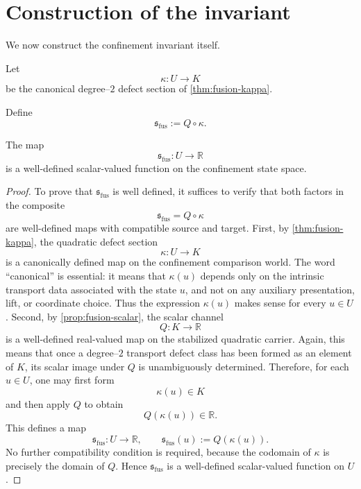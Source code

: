\section{Construction of the invariant}
\label{sec:fusion-construction}
We now construct the confinement invariant itself.
\begin{definition}
	Let
	\[
		\kappa:U\to K
	\]
	be the canonical degree--\(2\) defect section of
	\cref{thm:fusion-kappa}.
\end{definition}
\begin{definition}
	Define
	\[
		\mathfrak s_{\mathrm{fus}}:=Q\circ \kappa.
	\]
\end{definition}
\begin{theorem}[Existence]
	\label{thm:fusion-existence}
	The map
	\[
		\mathfrak s_{\mathrm{fus}}:U\to\mathbb R
	\]
	is a well-defined scalar-valued function on the confinement state space.
\end{theorem}
\begin{proof}
	To prove that \(\mathfrak s_{\mathrm{fus}}\) is well defined, it suffices to verify that both
	factors in the composite
	\[
		\mathfrak s_{\mathrm{fus}}=Q\circ\kappa
	\]
	are well-defined maps with compatible source and target.
	First, by \cref{thm:fusion-kappa}, the quadratic defect section
	\[
		\kappa:U\to K
	\]
	is a canonically defined map on the confinement comparison world. The
	word ``canonical'' is essential: it means that \(\kappa(u)\) depends
	only on the intrinsic transport data associated with the state \(u\), and
	not on any auxiliary presentation, lift, or coordinate choice. Thus the
	expression \(\kappa(u)\) makes sense for every \(u\in U\).
	Second, by \cref{prop:fusion-scalar}, the scalar channel
	\[
		Q:K\to\mathbb R
	\]
	is a well-defined real-valued map on the stabilized quadratic carrier.
	Again, this means that once a degree--\(2\) transport defect class has
	been formed as an element of \(K\), its scalar image under \(Q\) is
	unambiguously determined.
	Therefore, for each \(u\in U\), one may first form
	\[
		\kappa(u)\in K
	\]
	and then apply \(Q\) to obtain
	\[
		Q(\kappa(u))\in\mathbb R.
	\]
	This defines a map
	\[
		\mathfrak s_{\mathrm{fus}}:U\to\mathbb R,
		\qquad
		\mathfrak s_{\mathrm{fus}}(u):=Q(\kappa(u)).
	\]
	No further compatibility condition is required, because the codomain of
	\(\kappa\) is precisely the domain of \(Q\).
	Hence \(\mathfrak s_{\mathrm{fus}}\) is a well-defined scalar-valued function on \(U\).
\end{proof}
